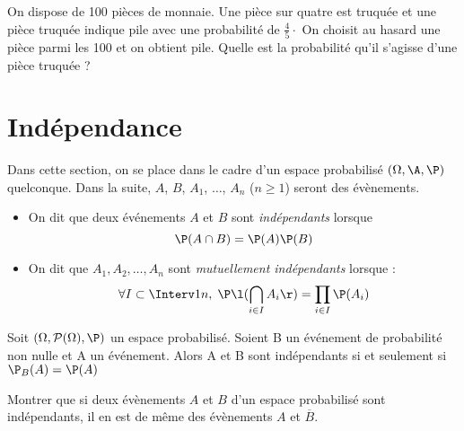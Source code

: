 \documentclass[a4paper,10pt]{report}
\begin{document}
\begin{enumerate}
\begin{itemize}
\begin{Exemple}
\vspace{6cm}
\end{Exemple}

\newpage

$\phantom{test}$

\vspace{4cm}

\begin{ApplicationDirecte} On dispose de 100 pièces de monnaie. Une pièce sur quatre est truquée et une pièce truquée indique pile avec une probabilité de $\frac{4}{5} \cdot$ On choisit au hasard une pièce parmi les 100 et on obtient pile. Quelle est la probabilité qu'il s'agisse d'une pièce truquée ?
\end{ApplicationDirecte}

\section{Indépendance}
Dans cette section, on se place dans le cadre d'un espace probabilisé $(\Omega, \A, \P)$ quelconque. Dans la suite, $A$, $B$, $A_1$, $\ldots$, $A_n$ ($n \geq 1$) seront des évènements.



\begin{Definition}{}
\begin{itemize}
 \item On dit que deux événements $A$ et $B$ sont \emph{indépendants} lorsque 
$$\P(A \cap B)= \P(A)\P(B)$$
 \item On dit que $A_1,A_2,\ldots,A_n$ sont \emph{mutuellement indépendants} lorsque :
$$\forall I \subset \Interv 1n,\;\P\l(\bigcap_{i \in I}A_i\r)= \prod_{i \in I}\P(A_i)$$
\end{itemize}
\end{Definition}

\begin{Proposition}{}
Soit $(\Omega,\mathcal{P}(\Omega),\P)$ un espace probabilisé. Soient B un événement de probabilité non nulle et A un événement. Alors A et B sont indépendants si et seulement si $\P_B(A)=\P(A)$
\end{Proposition}

\begin{Demonstration}{}

\vspace{4cm}
\end{Demonstration}

\begin{ApplicationDirecte} Montrer que si deux évènements $A$ et $B$ d'un espace probabilisé sont indépendants, il en est de même des évènements $A$ et $\overline{B}$.
\end{ApplicationDirecte}




\end{itemize}
\end{enumerate}
\end{document}
